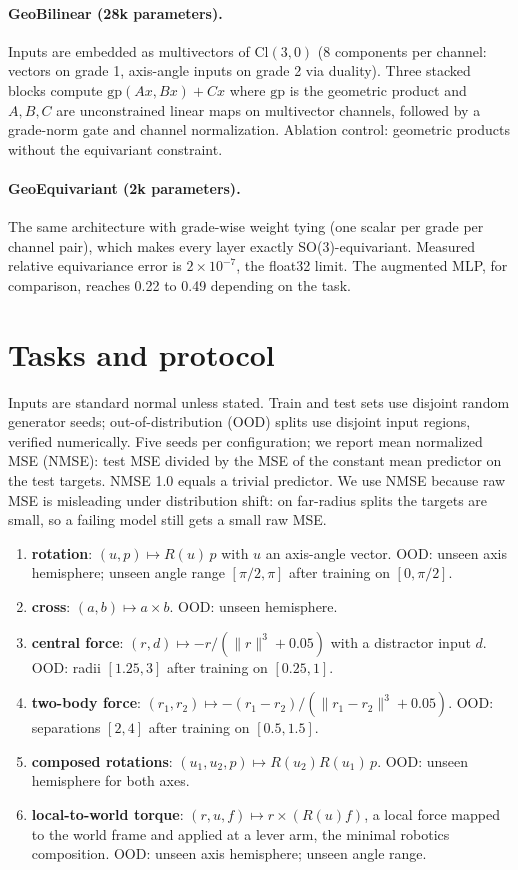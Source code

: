 \documentclass[11pt]{article}
\begin{document}
\paragraph{GeoBilinear (28k parameters).} Inputs are embedded as multivectors
of $\mathrm{Cl}(3,0)$ (8 components per channel: vectors on grade 1, axis-angle
inputs on grade 2 via duality). Three stacked blocks compute
$\mathrm{gp}(Ax, Bx) + Cx$ where $\mathrm{gp}$ is the geometric product and
$A, B, C$ are unconstrained linear maps on multivector channels, followed by a
grade-norm gate and channel normalization. Ablation control: geometric
products without the equivariant constraint.

\paragraph{GeoEquivariant (2k parameters).} The same architecture with
grade-wise weight tying (one scalar per grade per channel pair), which makes
every layer exactly SO(3)-equivariant. Measured relative equivariance error is
$2\times 10^{-7}$, the float32 limit. The augmented MLP, for comparison,
reaches 0.22 to 0.49 depending on the task.

\section{Tasks and protocol}
\label{sec:tasks}

Inputs are standard normal unless stated. Train and test sets use disjoint
random generator seeds; out-of-distribution (OOD) splits use disjoint input
regions, verified numerically. Five seeds per configuration; we report mean
normalized MSE (NMSE): test MSE divided by the MSE of the constant mean
predictor on the test targets. NMSE 1.0 equals a trivial predictor. We use
NMSE because raw MSE is misleading under distribution shift: on far-radius
splits the targets are small, so a failing model still gets a small raw MSE.

\begin{enumerate}
\item \textbf{rotation}: $(u, p) \mapsto R(u)\,p$ with $u$ an axis-angle
vector. OOD: unseen axis hemisphere; unseen angle range $[\pi/2, \pi]$ after
training on $[0, \pi/2]$.
\item \textbf{cross}: $(a, b) \mapsto a \times b$. OOD: unseen hemisphere.
\item \textbf{central force}: $(r, d) \mapsto -r/(\lVert r\rVert^3 + 0.05)$
with a distractor input $d$. OOD: radii $[1.25, 3]$ after training on
$[0.25, 1]$.
\item \textbf{two-body force}: $(r_1, r_2) \mapsto
-(r_1 - r_2)/(\lVert r_1 - r_2\rVert^3 + 0.05)$. OOD: separations $[2, 4]$
after training on $[0.5, 1.5]$.
\item \textbf{composed rotations}: $(u_1, u_2, p) \mapsto R(u_2) R(u_1)\, p$.
OOD: unseen hemisphere for both axes.
\item \textbf{local-to-world torque}: $(r, u, f) \mapsto r \times (R(u) f)$,
a local force mapped to the world frame and applied at a lever arm, the
minimal robotics composition. OOD: unseen axis hemisphere; unseen angle range.
\end{enumerate}
\end{document}
